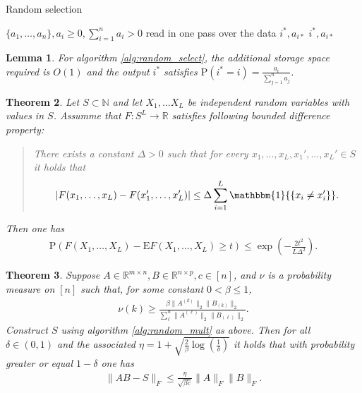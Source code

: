 \documentclass[13pt]{article}
\newtheorem{thm}{Theorem}[section]
\newtheorem{lem}[thm]{Lemma}
\theoremstyle{plain}
\newcommand{\R}{\mathbb{R}}
\newcommand{\N}{\mathbb{N}}
\newcommand{\E}{\bm{\mathrm{E}}}
\renewcommand{\P}{\bm{\mathrm{P}}}
\newcommand{\set}[1]{{\{#1\}}}
\newcommand{\ind}{\mathbbm{1}}
\begin{document}
\begin{algorithm}
\caption{Random selection}\label{alg:random_select}
\begin{algorithmic}
    \Require $\set{a_1, \ldots, a_n}, a_i \ge 0, \sum_{i=1}^{n} a_i > 0$ read in one pass over the data
    \Ensure $i^\ast, a_{i\ast}$
        \Comment{$\P = 1$ if $a_i = D = 0$}
    \EndFor
    \State \Return $i^\ast, a_{i\ast} $ 
\end{algorithmic}
\end{algorithm}

\begin{lem}
    For algorithm \ref{alg:random_select}, the additional storage space required
    is $O(1)$ and the output $i^\ast$ satisfies $\P(i^\ast = i) = \frac{a_i}{\sum_{j=1}^{n} a_j}$.
\end{lem}

\begin{thm}
    Let $S \subset \N$ and let $X_1, \ldots X_L$ be independent random variables
    with values in $S$. Assumme that $F: S^L \to \R$ satisfies following
    bounded difference property:
    \begin{quotation}
        There exists a constant $\Delta > 0$ such that for every
        $x_1,\ldots,x_L, x_1', \ldots, x_L' \in S$ it holds that
        \[
            \begin{aligned}
                |F(x_1, \ldots, x_L) - F(x_1', \ldots, x_L')| \le
                \Delta \sum_{i=1}^{L} \ind\set{x_i \ne x_i'}.
            \end{aligned}
        \]
    \end{quotation}
    Then one has
    \[
        \begin{aligned}
            \P\left( F\left( X_1,\ldots,X_L \right) - \E F(X_1,\ldots,X_L) \ge t \right)
            \le \exp\left( - \frac{2t^2}{L\Delta^2} \right) .
        \end{aligned}
    \]
\end{thm}

\begin{thm}
    Suppose $A \in \R^{m \times n}, B \in \R^{n \times p}, c \in [n]$,
    and $\nu$ is a probability measure on $[n]$ such that,
    for some constant $0 < \beta \le 1$,
    \[
        \begin{aligned}
            \nu(k) \ge \frac{\beta\|A^{(k)}\|_2\|B_{(k)}\|_2}{\sum_{\ell}^{n} \|A^{(\ell)}\|_2\|B_{(\ell)}\|_{2}}.
        \end{aligned}
    \]
    Construct $S$ using algorithm \ref{alg:random_mult} as above.
    Then for all $\delta \in (0, 1)$ and the associated $\eta = 1 + \sqrt{\frac{2}{\beta}\log(\frac{1}{\delta})} $
    it holds that with probability greater or equal $1 - \delta$ one has
    \[
        \begin{aligned}
            \|AB - S\|_F \le \frac{\eta}{\sqrt{\beta c}}\|A\|_F\|B\|_F.
        \end{aligned}
    \]
\end{thm}
\end{document}
